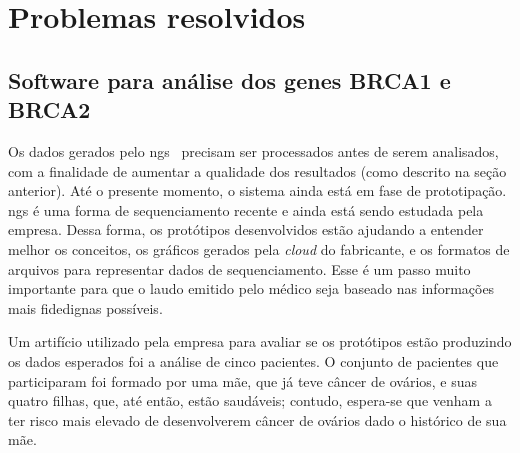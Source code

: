 
%
%


\section{Problemas resolvidos}

\subsection{Software para análise dos genes BRCA1 e BRCA2}

Os dados gerados pelo \gls{ngs}~\cite{SamTools} precisam ser processados antes de serem analisados, com a finalidade de aumentar a qualidade
dos resultados (como descrito na seção anterior).
Até o presente momento, o sistema ainda está em fase de prototipação. \gls{ngs} é uma forma de sequenciamento
recente e ainda está sendo estudada pela empresa. Dessa forma, os protótipos desenvolvidos estão ajudando a entender melhor os conceitos, os gráficos
gerados pela \textit{cloud} do fabricante, e os formatos de arquivos para representar dados de sequenciamento. Esse é um passo muito importante para que
o laudo emitido pelo médico seja baseado nas informações mais fidedignas possíveis.

Um artifício utilizado pela empresa para avaliar se os protótipos estão produzindo os dados esperados foi a análise de cinco pacientes.
O conjunto de pacientes que participaram foi formado por uma mãe, que já teve câncer de ovários, e suas quatro filhas, que, até então, estão saudáveis;
contudo, espera-se que venham a ter risco mais elevado de desenvolverem câncer de ovários dado o histórico de sua mãe.

